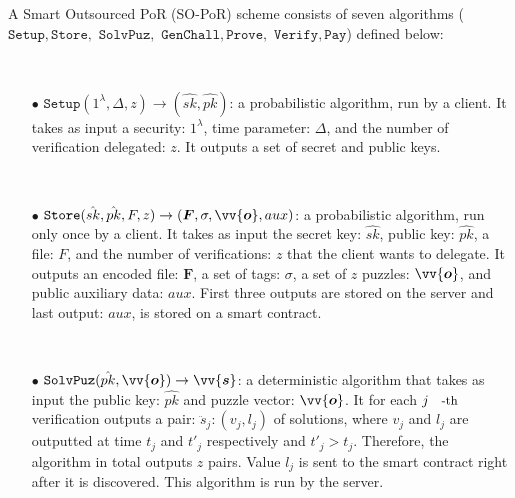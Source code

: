 \begin{definition}
A Smart Outsourced PoR (SO-PoR) scheme consists of seven algorithms ($\mathtt{Setup}, \mathtt{Store},$ $ \mathtt {SolvPuz}, $ $ \mathtt{GenChall}, \mathtt{Prove},$ $ \mathtt{Verify},  \mathtt{Pay}$) defined below: 


\
\begin{itemize}
\item[$\bullet$] $\mathtt{Setup}(1^{\scriptscriptstyle\lambda},\Delta, z)\rightarrow (\hat{sk},\hat{pk})$:  a probabilistic algorithm, run by a client.  It  takes as input a security: $1^{\scriptscriptstyle\lambda}$, time parameter: $\Delta$, and the number of verification delegated: $z$. It  outputs a set of  secret and public keys.

\

\item[$\bullet$] $\mathtt{Store}(\hat{sk},\hat{pk}, F,z)\rightarrow ({\bm{F}}, \sigma, \vv{\bm{o}},aux)$: a probabilistic algorithm, run only once by a client. It  takes as  input the secret key: $\hat{sk}$, public key: $\hat{pk}$, a file: $F$, and the number of verifications: $z$ that the client wants to delegate. It outputs an encoded file: ${\bm{F}}$,  a set of tags: $\sigma$, a set of $z$ puzzles: $\vv{\bm{o}}$, and public auxiliary data: $aux$. First three outputs are stored on the server and last output: $aux$, is   stored on a smart contract. 

\

\item[$\bullet$] $\mathtt {SolvPuz}(\hat{pk},\vv{\bm{o}})\rightarrow \vv{\bm{s}}$:  a deterministic algorithm that takes as input the public key: $\hat{pk}$ and puzzle vector: $\vv{\bm{o}}$.  It for each  $j\text{\small{-th}}$ verification outputs a  pair: $\ddot{s}_{\scriptscriptstyle j}:(v_{\scriptscriptstyle j},l_{\scriptscriptstyle j})$ of solutions, where $v_{\scriptscriptstyle j}$ and $l_{\scriptscriptstyle j}$ are outputted at time $t_{\scriptscriptstyle j}$ and $t'_{\scriptscriptstyle j}$ respectively and $t'_{\scriptscriptstyle j}> t_{\scriptscriptstyle j}$. Therefore, the algorithm in total outputs $z$ pairs. Value $l_{\scriptscriptstyle j}$ is sent  to the smart contract right after it is discovered. This algorithm is run  by the server.

\



\end{itemize}
\end{definition}
